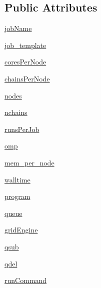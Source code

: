 \subsection*{Public Attributes}
\begin{DoxyCompactItemize}
\item 
\mbox{\hyperlink{classparamgrid_1_1jobqueue_1_1jobSettings_ab97074be0f8204269aa48d70c43de0e2}{job\+Name}}
\item 
\mbox{\hyperlink{classparamgrid_1_1jobqueue_1_1jobSettings_a78b2885ec0e85352de5426513ad8f0bd}{job\+\_\+template}}
\item 
\mbox{\hyperlink{classparamgrid_1_1jobqueue_1_1jobSettings_a2f3ca49a0a98e26d7db16ff842be04cf}{cores\+Per\+Node}}
\item 
\mbox{\hyperlink{classparamgrid_1_1jobqueue_1_1jobSettings_a870ddedb49a6a915832b6b014be301d0}{chains\+Per\+Node}}
\item 
\mbox{\hyperlink{classparamgrid_1_1jobqueue_1_1jobSettings_ae04aa0d41ef24e915e9490377f1f64bb}{nodes}}
\item 
\mbox{\hyperlink{classparamgrid_1_1jobqueue_1_1jobSettings_ab4f0fa25d04e7257d0702c8c513b145d}{nchains}}
\item 
\mbox{\hyperlink{classparamgrid_1_1jobqueue_1_1jobSettings_a232cb6fd95e26f0301f69c66fad65d75}{runs\+Per\+Job}}
\item 
\mbox{\hyperlink{classparamgrid_1_1jobqueue_1_1jobSettings_aac91e487b746e9aec43ef38f37fb4469}{omp}}
\item 
\mbox{\hyperlink{classparamgrid_1_1jobqueue_1_1jobSettings_a895566a475c7777df170d846ef9a6675}{mem\+\_\+per\+\_\+node}}
\item 
\mbox{\hyperlink{classparamgrid_1_1jobqueue_1_1jobSettings_a9f72a8029ca0cf2e75d8e8e4e5daa0a3}{walltime}}
\item 
\mbox{\hyperlink{classparamgrid_1_1jobqueue_1_1jobSettings_aa21cd9ede10883341165d24a5298db49}{program}}
\item 
\mbox{\hyperlink{classparamgrid_1_1jobqueue_1_1jobSettings_adb8e666d2c3c05151d284016f0976404}{queue}}
\item 
\mbox{\hyperlink{classparamgrid_1_1jobqueue_1_1jobSettings_ac29f7da39c15b69fb90ed733c2e85105}{grid\+Engine}}
\item 
\mbox{\hyperlink{classparamgrid_1_1jobqueue_1_1jobSettings_a10a21e33ffc3dfda8aebfc0338e77e2b}{qsub}}
\item 
\mbox{\hyperlink{classparamgrid_1_1jobqueue_1_1jobSettings_a95ebdd9892884a3bb66639ba8b98f680}{qdel}}
\item 
\mbox{\hyperlink{classparamgrid_1_1jobqueue_1_1jobSettings_a19cb3ccb67dd52af936b3134ba94121f}{run\+Command}}
\end{DoxyCompactItemize}


